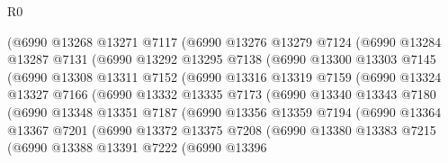 \begin{lexlean}{R0}
\begin{coremodule}
                (@6990
                  @13268
                  @13271
                  @7117
                  (@6990
                    @13276
                    @13279
                    @7124
                    (@6990
                      @13284
                      @13287
                      @7131
                      (@6990
                        @13292
                        @13295
                        @7138
                        (@6990
                          @13300
                          @13303
                          @7145
                          (@6990
                            @13308
                            @13311
                            @7152
                            (@6990
                              @13316
                              @13319
                              @7159
                              (@6990
                                @13324
                                @13327
                                @7166
                                (@6990
                                  @13332
                                  @13335
                                  @7173
                                  (@6990
                                    @13340
                                    @13343
                                    @7180
                                    (@6990
                                      @13348
                                      @13351
                                      @7187
                                      (@6990
                                        @13356
                                        @13359
                                        @7194
                                        (@6990
                                          @13364
                                          @13367
                                          @7201
                                          (@6990
                                            @13372
                                            @13375
                                            @7208
                                            (@6990
                                              @13380
                                              @13383
                                              @7215
                                              (@6990
                                                @13388
                                                @13391
                                                @7222
                                                (@6990
                                                  @13396

\end{coremodule}
\end{lexlean}
